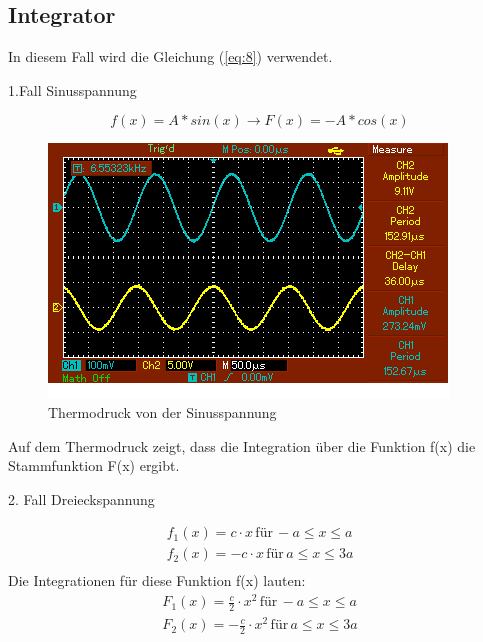 \subsection{Integrator}
In diesem Fall wird die Gleichung (\ref{eq:8}) verwendet. \\
\centerline{1.Fall Sinusspannung}
\begin{equation*}
  f(x) = A * sin(x) \rightarrow F(x)= - A * cos(x)
\end{equation*}
\begin{figure}[H]
  \centering
  \includegraphics[width=\textwidth]{sinus.png}
  \caption{Thermodruck von der Sinusspannung}
  \label{fig:10}
\end{figure}
Auf dem Thermodruck zeigt, dass die Integration über die Funktion f(x) die
Stammfunktion F(x) ergibt.\\
\centerline{2. Fall Dreieckspannung}
\begin{align*}
  f_1 (x) = c \cdot x \, \text{für} \, -a \leq x \leq a \\
  f_2 (x) =-c \cdot x \, \text{für} \, a \leq x \leq 3a \\
\end{align*}
Die Integrationen für diese Funktion f(x) lauten:
\begin{align*}
  F_1 (x) = \frac{c}{2} \cdot x^{2} \, \text{für} \,-a \leq x \leq a \\
  F_2 (x) = -\frac{c}{2} \cdot x^{2} \, \text{für} \, a \leq x \leq 3a \\
\end{align*}
